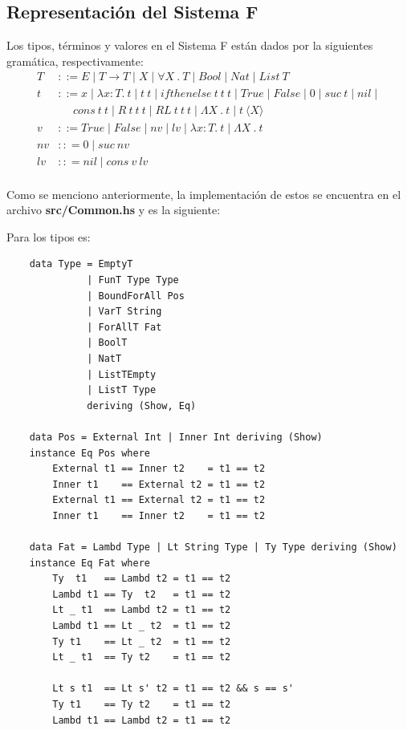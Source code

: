 \documentclass[12pt, titlepage, a4paper]{article}
\begin{document}
\subsection{Representación del Sistema F}
Los tipos, términos y valores en el Sistema F están dados por la siguientes gramática, respectivamente:
\begin{align*}
    T &::= E \mid T \rightarrow T \mid X \mid \forall X \ . \ T \mid Bool \mid Nat \mid List \ T\\
    t &::= x \mid \lambda x:T. \ t \mid t \ t \mid ifthenelse \ t \ t \ t \mid True \mid False \mid 0 \mid suc \ t \mid  nil \mid  \\
    & \ \ \ \ \ \ cons \ t \ t \mid R \ t \ t \ t \mid RL \ t \ t \ t \mid \Lambda X \ . \ t \mid t \ \langle X \rangle \\
    v &::= True \mid False \mid nv \mid lv \mid \lambda x:T. \ t \mid \Lambda X \ . \ t \\
    nv &:: = 0 \mid suc \ nv \\
    lv &:: = nil \mid cons \ v \ lv \\
\end{align*}

Como se menciono anteriormente, la implementación de estos se encuentra en el archivo \textbf{src/Common.hs} y es la siguiente:

\noindent Para los tipos es:
\begin{verbatim}
    data Type = EmptyT 
              | FunT Type Type
              | BoundForAll Pos
              | VarT String
              | ForAllT Fat
              | BoolT
              | NatT
              | ListTEmpty
              | ListT Type
              deriving (Show, Eq)

    data Pos = External Int | Inner Int deriving (Show)
    instance Eq Pos where
        External t1 == Inner t2    = t1 == t2
        Inner t1    == External t2 = t1 == t2
        External t1 == External t2 = t1 == t2
        Inner t1    == Inner t2    = t1 == t2
    
    data Fat = Lambd Type | Lt String Type | Ty Type deriving (Show)
    instance Eq Fat where
        Ty  t1   == Lambd t2 = t1 == t2
        Lambd t1 == Ty  t2   = t1 == t2
        Lt _ t1  == Lambd t2 = t1 == t2
        Lambd t1 == Lt _ t2  = t1 == t2
        Ty t1    == Lt _ t2  = t1 == t2
        Lt _ t1  == Ty t2    = t1 == t2
    
        Lt s t1  == Lt s' t2 = t1 == t2 && s == s'   
        Ty t1    == Ty t2    = t1 == t2
        Lambd t1 == Lambd t2 = t1 == t2
\end{verbatim}
\end{document}
